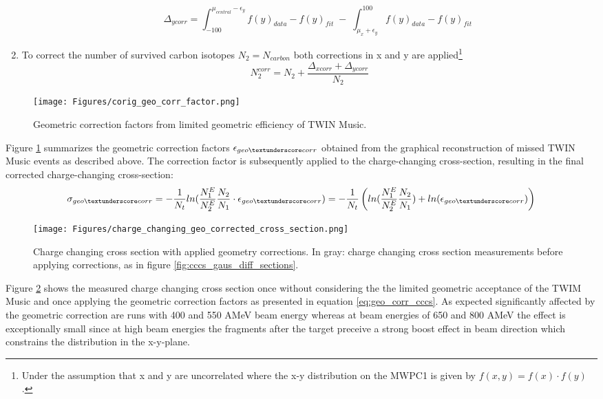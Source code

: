 \begin{enumerate}
\begin{enumerate}
\begin{equation}
\Delta_{ycorr} = \int_{-100}^{\mu_{central} - \epsilon_y} f(y)_{data} - f(y)_{fit} \; - \; \int_{\mu_x + \epsilon_y}^{100} f(y)_{data} - f(y)_{fit} 
\end{equation}
\end{enumerate}
\item To correct the number of survived carbon isotopes $N_2 = N_{carbon}$ both corrections in x and y are applied\footnote{Under the assumption that x and y are uncorrelated where the x-y distribution on the MWPC1 is given by $f(x,y) = f(x)\cdot f(y)$.}
\begin{equation}
N_2^{corr} = N_2 +\frac{\Delta_{xcorr}+\Delta_{ycorr}}{N_2}
\end{equation}
\end{enumerate}
\begin{figure}[htpb]
    \centering
    \texttt{[image: Figures/corig\_geo\_corr\_factor.png]}
    \caption{
    Geometric correction factors from limited geometric efficiency of TWIN Music. 
     }
    \label{fig:geo_corr_twim}
\end{figure}
Figure \ref{fig:geo_corr_twim} summarizes the geometric correction factors $\epsilon_{geo\textunderscore corr}$ obtained from the graphical reconstruction of missed TWIN Music events as described above. The correction factor is subsequently applied to the charge-changing cross-section, resulting in the final corrected charge-changing cross-section:
\begin{equation}
\sigma_{geo\textunderscore corr} = -\frac{1}{N_t} ln(\frac{N_{1}^E}{N_{2}^E}\frac{N_2}{N_1}\cdot \epsilon_{geo\textunderscore corr}) = -\frac{1}{N_t} \left( ln(\frac{N_{1}^E}{N_{2}^E}\frac{N_2}{N_1}) + ln(\epsilon_{geo\textunderscore corr})\right)
\label{eq:geo_corr_cccs}
\end{equation}
\begin{figure}[htpb]
    \centering
    \texttt{[image: Figures/charge\_changing\_geo\_corrected\_cross\_section.png]}
    \caption{
    Charge changing cross section with applied geometry corrections. In gray: charge changing cross section measurements before applying corrections, as in figure \ref{fig:cccs_gaus_diff_sections}. 
     }
    \label{fig:geo_corr_cross_sec}
\end{figure}
Figure \ref{fig:geo_corr_cross_sec} shows the measured charge changing cross section once without considering the the limited geometric acceptance of the TWIM Music and once applying the geometric correction factors as presented in equation \ref{eq:geo_corr_cccs}. As expected significantly affected by the  geometric correction are runs with 400 and 550 AMeV beam energy whereas at beam energies of 650 and 800 AMeV the effect is exceptionally small since at high beam energies  the fragments after the target preceive a strong boost effect in beam direction which constrains the distribution in the x-y-plane.

